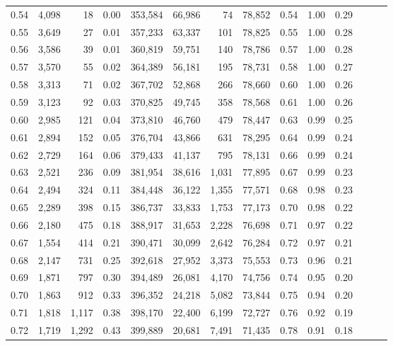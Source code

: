 \begin{tabular}{rrrrrrrrrrrrrr}
0.54 &  4,098 &     18 &  0.00 &  353,584 &   66,986 &      74 &  78,852 &  0.54 &  1.00 &      0.29 \\
0.55 &  3,649 &     27 &  0.01 &  357,233 &   63,337 &     101 &  78,825 &  0.55 &  1.00 &      0.28 \\
0.56 &  3,586 &     39 &  0.01 &  360,819 &   59,751 &     140 &  78,786 &  0.57 &  1.00 &      0.28 \\
0.57 &  3,570 &     55 &  0.02 &  364,389 &   56,181 &     195 &  78,731 &  0.58 &  1.00 &      0.27 \\
0.58 &  3,313 &     71 &  0.02 &  367,702 &   52,868 &     266 &  78,660 &  0.60 &  1.00 &      0.26 \\
0.59 &  3,123 &     92 &  0.03 &  370,825 &   49,745 &     358 &  78,568 &  0.61 &  1.00 &      0.26 \\
0.60 &  2,985 &    121 &  0.04 &  373,810 &   46,760 &     479 &  78,447 &  0.63 &  0.99 &      0.25 \\
0.61 &  2,894 &    152 &  0.05 &  376,704 &   43,866 &     631 &  78,295 &  0.64 &  0.99 &      0.24 \\
0.62 &  2,729 &    164 &  0.06 &  379,433 &   41,137 &     795 &  78,131 &  0.66 &  0.99 &      0.24 \\
0.63 &  2,521 &    236 &  0.09 &  381,954 &   38,616 &   1,031 &  77,895 &  0.67 &  0.99 &      0.23 \\
0.64 &  2,494 &    324 &  0.11 &  384,448 &   36,122 &   1,355 &  77,571 &  0.68 &  0.98 &      0.23 \\
0.65 &  2,289 &    398 &  0.15 &  386,737 &   33,833 &   1,753 &  77,173 &  0.70 &  0.98 &      0.22 \\
0.66 &  2,180 &    475 &  0.18 &  388,917 &   31,653 &   2,228 &  76,698 &  0.71 &  0.97 &      0.22 \\
0.67 &  1,554 &    414 &  0.21 &  390,471 &   30,099 &   2,642 &  76,284 &  0.72 &  0.97 &      0.21 \\
0.68 &  2,147 &    731 &  0.25 &  392,618 &   27,952 &   3,373 &  75,553 &  0.73 &  0.96 &      0.21 \\
0.69 &  1,871 &    797 &  0.30 &  394,489 &   26,081 &   4,170 &  74,756 &  0.74 &  0.95 &      0.20 \\
0.70 &  1,863 &    912 &  0.33 &  396,352 &   24,218 &   5,082 &  73,844 &  0.75 &  0.94 &      0.20 \\
0.71 &  1,818 &  1,117 &  0.38 &  398,170 &   22,400 &   6,199 &  72,727 &  0.76 &  0.92 &      0.19 \\
0.72 &  1,719 &  1,292 &  0.43 &  399,889 &   20,681 &   7,491 &  71,435 &  0.78 &  0.91 &      0.18 \\

\end{tabular}
